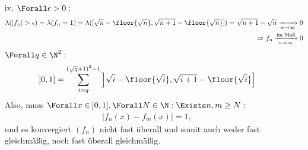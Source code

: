 \begin{solution}
\begin{itemize}
  \item[iv.] $\Forall \epsilon > 0:$
  \begin{align*}
    \lambda(|f_n| > \epsilon)
    =
    \lambda(f_n = 1)
    =
    \lambda
    ([\sqrt{n} - \floor{\sqrt{n}}, \sqrt{n+1} - \floor{\sqrt{n}}])
    =
    \sqrt{n+1} - \sqrt{n}
    \xrightarrow[n \to \infty]{} 0 \\
    \Rightarrow
    f_n \xrightarrow[n \to \infty]{\text{im Maß}} 0
  \end{align*}
  $\Forall q \in \N^2:$
  \begin{align*}
    ]0, 1]
    =
    \sum_{i = q}^{(\sqrt{q}+1)^2-1}
    \left ]
    \sqrt{i} - \floor{\sqrt{i}}, \sqrt{i+1} - \floor{\sqrt{i}}
    \right ]
  \end{align*}
  Also, muss $\Forall x \in \: ]0, 1], \Forall N \in \N: \Exists n, m \geq N:$
  \begin{align*}
    |f_n(x) - f_m(x)| = 1,
  \end{align*}
  und es konvergiert $(f_n)$ nicht fast überall und somit auch weder fast gleichmäßig, noch fast überall gleichmäßig.

\end{itemize}

\end{solution}

